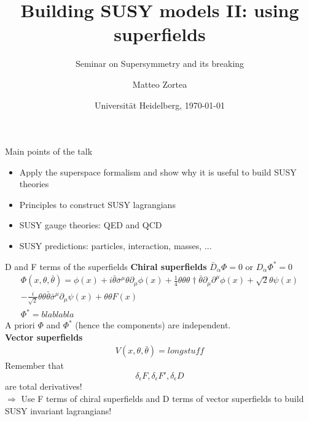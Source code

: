 \documentclass[10pt]{beamer}
\title{Building SUSY models II: using superfields}
\subtitle{Seminar on Supersymmetry and its breaking}
\author{Matteo Zortea}
\date{Universit\"at Heidelberg, \today}
\institute{Coordinated by prof. Joerg J\"ackel}
\begin{document}
\begin{frame}
\titlepage
\end{frame}

\begin{frame}{Main points of the talk}
\begin{itemize}
    \item Apply the superspace formalism and show why it is useful to build SUSY theories
    \vfill
    \item Principles to construct SUSY lagrangians 
    \vfill
    \item SUSY gauge theories: QED and QCD
    \vfill
    \item SUSY predictions: particles, interaction, masses, ...
\end{itemize}
\end{frame}

\begin{frame}{D and F terms of the superfields}
\textbf{Chiral superfields} $\bar D_{\dot\alpha} \Phi = 0$ or $D_{\alpha}\Phi^* = 0$
\begin{gather*}
    \Phi(x, \theta, \bar\theta) = \phi(x) + i\bar\theta \bar\sigma^{\mu}\theta \partial_{\mu}\phi(x) + \frac{1}{4}\theta\theta\theta{\dagger}\bar\theta\partial_{\mu}\partial^{\mu}\phi(x) + \sqrt{2}\theta\psi(x)\\ 
    -\frac{i}{\sqrt{2}}\theta\theta\bar\theta\bar\sigma^{\mu}\partial_{\mu}\psi(x) + \theta\theta F(x) \\
    \Phi^* = blablabla
\end{gather*}
A priori $\Phi$ and $\Phi^*$ (hence the components) are independent. \\
\textbf{Vector superfields}
\begin{gather*}
    V(x, \theta, \bar\theta) = long stuff
\end{gather*}
Remember that
\begin{equation*}
    \delta_{\epsilon} F, \delta_{\epsilon} F',\delta_{\epsilon} D
\end{equation*}
are total derivatives! \\
$\Rightarrow$ Use F terms of chiral superfields and D terms of vector superfields to build SUSY invariant lagrangians!
\end{frame}
\end{document}
